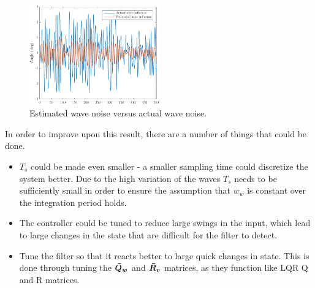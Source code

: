 \begin{figure}[htp]
    \centering
    \includegraphics[width=0.5\textwidth]{images/5e-wave_influence}
    \caption{Estimated wave noise versus actual wave noise.}
    \label{fig:5e-wave_influence}
\end{figure}

In order to improve upon this result, there are a number of things that could be done.
\begin{itemize}
    \item $T_s$ could be made even smaller - a smaller sampling time could discretize the system better. Due to the high variation of the waves $T_s$ needs to be sufficiently small in order to ensure the assumption that $w_w$ is constant over the integration period holds.
    \item The controller could be tuned to reduce large swings in the input, which lead to large changes in the state that are difficult for the filter to detect. 
    \item Tune the filter so that it reacts better to large quick changes in state. This is done through tuning the $\bmbar{Q}_{\bm{w}}$ and $\bmbar{R}_{\bm{v}}$ matrices, as they function like LQR Q and R matrices.

\end{itemize}